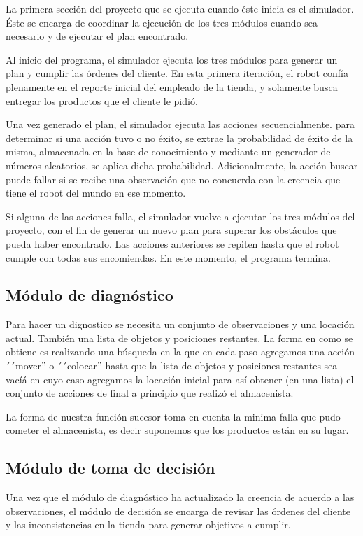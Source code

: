 \documentclass[11pt]{article}
\begin{document}
La primera sección del proyecto que se ejecuta cuando éste inicia es el simulador. Éste se encarga de coordinar la ejecución de los tres módulos cuando sea necesario y de ejecutar el plan encontrado.

Al inicio del programa, el simulador ejecuta los tres módulos para generar un plan y cumplir las órdenes del cliente. En esta primera iteración, el robot confía plenamente en el reporte inicial del empleado de la tienda, y solamente busca entregar los productos que el cliente le pidió.

Una vez generado el plan, el simulador ejecuta las acciones secuencialmente. para determinar si una acción tuvo o no éxito, se extrae la probabilidad de éxito de la misma, almacenada en la base de conocimiento y mediante un generador de números aleatorios, se aplica dicha probabilidad. Adicionalmente, la acción buscar puede fallar si se recibe una observación que no concuerda con la creencia que tiene el robot del mundo en ese momento.

Si alguna de las acciones falla, el simulador vuelve a ejecutar los tres módulos del proyecto, con el fin de generar un nuevo plan para superar los obstáculos que pueda haber encontrado. Las acciones anteriores se repiten hasta que el robot cumple con todas sus encomiendas. En este momento, el programa termina.

\subsection{Módulo de diagnóstico}

Para hacer un dignostico se necesita un conjunto de observaciones y una
locación actual. También una lista de objetos y posiciones restantes.
La forma en como se obtiene es realizando una búsqueda en la que en cada
paso agregamos una acción ´´mover'' o ´´colocar'' hasta que la lista de
objetos y posiciones restantes sea vacíá en cuyo caso agregamos la
locación inicial para así obtener (en una lista) el conjunto de acciones
de final a principio que realizó el almacenista.

La forma de nuestra función sucesor toma en cuenta la minima falla que pudo
cometer el almacenista, es decir suponemos que los productos están en su
lugar.

\subsection{Módulo de toma de decisión}

Una vez que el módulo de diagnóstico ha actualizado la creencia de acuerdo a las observaciones, el módulo de decisión se encarga de revisar las órdenes del cliente y las inconsistencias en la tienda para generar objetivos a cumplir.
\end{document}
